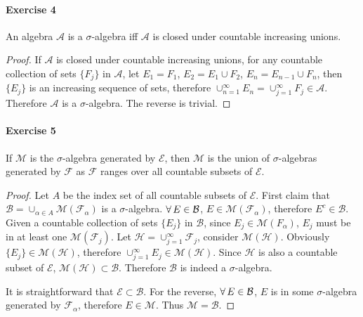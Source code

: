 \paragraph{Exercise 4}
An algebra $\mathcal{A}$ is a $\sigma$-algebra iff $\mathcal{A}$ is closed under countable increasing unions.
\begin{proof}
    If $\mathcal{A}$ is closed under countable increasing unions, for any countable collection of sets $\{F_j\}$ in $\mathcal{A}$, let $E_1=F_1$, $E_2=E_1\cup F_2$, $E_n=E_{n-1}\cup F_n$, then $\{E_j\}$ is an increasing sequence of sets, therefore $\cup^{\infty}_{n=1}E_n=\cup^{\infty}_{j=1}F_j\in\mathcal{A}$. Therefore $\mathcal{A}$ is a $\sigma$-algebra. The reverse is trivial.
\end{proof}
\paragraph{Exercise 5}
If $\mathcal{M}$ is the $\sigma$-algebra generated by $\mathcal{E}$, then $\mathcal{M}$ is the union of $\sigma$-algebras generated by $\mathcal{F}$ as $\mathcal{F}$ ranges over all countable subsets of $\mathcal{E}$.
\begin{proof}
    Let $A$ be the index set of all countable subsets of $\mathcal{E}$. First claim that $\mathcal{B}=\cup_{\alpha\in A}\mathcal{M}(\mathcal{F}_{\alpha})$ is a $\sigma$-algebra. $\forall\, E\in\mathcal{B}$, $E\in\mathcal{M}(\mathcal{F}_\alpha)$, therefore $E^c\in\mathcal{B}$. Given a countable collection of sets $\{E_j\}$ in $\mathcal{B}$, since $E_j\in\mathcal{M}({F_\alpha})$, $E_j$ must be in at least one $\mathcal{M}(\mathcal{F}_j)$. Let $\mathcal{H}=\cup^{\infty}_{j=1}\mathcal{F}_j$, consider $\mathcal{M}(\mathcal{H})$. Obviously $\{E_j\}\in\mathcal{M}(\mathcal{H})$, therefore $\cup^\infty_{j=1}E_j\in\mathcal{M}(\mathcal{H})$. Since $\mathcal{H}$ is also a countable subset of $\mathcal{E}$, $\mathcal{M}(\mathcal{H})\subset\mathcal{B}$. Therefore $\mathcal{B}$ is indeed a $\sigma$-algebra.
    \par It is straightforward that $\mathcal{E}\subset\mathcal{B}$. For the reverse, $\forall\, E\in\mathcal{B}$, $E$ is in some $\sigma$-algebra generated by $\mathcal{F}_\alpha$, therefore $E\in\mathcal{M}$. Thus $\mathcal{M}=\mathcal{B}$.
\end{proof}
